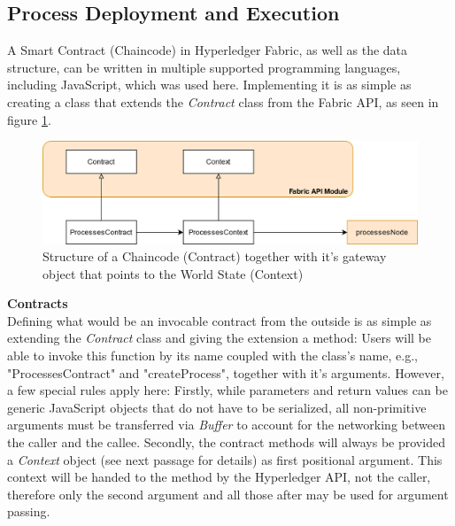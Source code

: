 \subsection{Process Deployment and Execution}
\label{sec:impr:hl:chaincode}

A Smart Contract (Chaincode) in Hyperledger Fabric, as well as the data structure, can be written in multiple supported programming languages, including JavaScript, which was used here. Implementing it is as simple as creating a class that extends the \emph{Contract} class from the Fabric API, as seen in figure \ref{fig:impr:hl:contract}.

\begin{figure}[h]
	\centering
	\captionsetup{justification=centering,margin=2cm}
	\includegraphics[width=\textwidth]{gfx/hl-contract}
	\caption{Structure of a Chaincode (Contract) together with it's gateway object that points to the World State (Context)}
	\label{fig:impr:hl:contract}
\end{figure}

\textbf{Contracts} \\[0.2em]
Defining what would be an invocable contract from the outside is as simple as extending the \emph{Contract} class and giving the extension a method: Users will be able to invoke this function by its name coupled with the class's name, e.g., "ProcessesContract" and "createProcess", together with it's arguments. However, a few special rules apply here: Firstly, while parameters and return values can be generic JavaScript objects that do not have to be serialized, all non-primitive arguments must be transferred via \emph{Buffer} to account for the networking between the caller and the callee. Secondly, the contract methods will always be provided a \emph{Context} object (see next passage for details) as first positional argument. This context will be handed to the method by the Hyperledger API, not the caller, therefore only the second argument and all those after may be used for argument passing.

